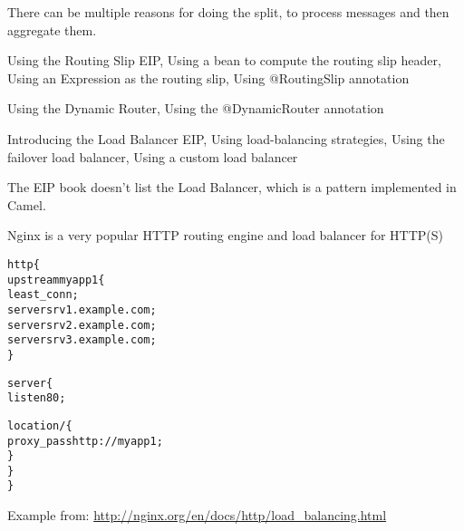\documentclass[Screen16to9,17pt]{foils}
\begin{document}


There can be multiple reasons for doing the split, to process messages and then aggregate them.



\begin{list2}
\item Using the Routing Slip EIP, Using a bean to compute the
routing slip header, Using an Expression as the routing
slip, Using @RoutingSlip annotation
\end{list2}

\begin{list2}
\item Using the Dynamic Router, Using the @DynamicRouter
 annotation
\end{list2}




\begin{list2}
\item Introducing the Load Balancer EIP, Using load-­balancing
strategies, Using the failover load balancer, Using a
custom load balancer
\item The EIP book doesn’t list the Load Balancer, which is a pattern implemented in Camel.
\item Nginx is a very popular HTTP routing engine and load balancer for HTTP(S)
\end{list2}



\begin{alltt}\footnotesize
  http \{
      upstream myapp1 \{
          least_conn;
          server srv1.example.com;
          server srv2.example.com;
          server srv3.example.com;
      \}

      server \{
          listen 80;

          location / \{
              proxy_pass http://myapp1;
          \}
      \}
  \}
\end{alltt}

Example from:
\url{http://nginx.org/en/docs/http/load_balancing.html}


\slidenext
\end{document}
